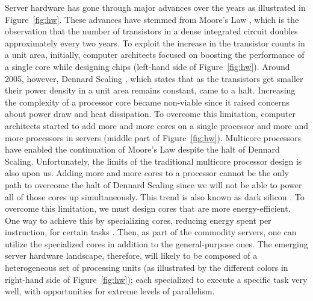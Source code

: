 \documentclass[11pt,dvipdfm]{article}
\newcommand{\reffig}[1]{Figure~\ref{fig:#1}}
\begin{document}
Server hardware has gone through major advances over the years as illustrated in \reffig{hw}.
These advances have stemmed from Moore’s Law \cite{Moore65},
which is the observation that the number of transistors in a dense integrated circuit doubles approximately every two years.
To exploit the increase in the transistor counts in a unit area, initially,
computer architects focused on boosting the performance of a single core while designing chips
(left-hand side of \reffig{hw}).
Around 2005, however, Dennard Scaling \cite{DennardGYRBAL74},
which states that as the transistors get smaller their power density in a unit area remains constant, came to a halt.
Increasing the complexity of a processor core became non-viable since it raised concerns about power draw and heat dissipation.
To overcome this limitation, computer architects started to add more and more cores on a single processor \cite{OlukotunNHWC96}
and more and more processors in servers (middle part of \reffig{hw}).
Multicore processors have enabled the continuation of Moore’s Law despite the halt of Dennard Scaling.
Unfortunately, the limits of the traditional multicore processor design is also upon us. 
Adding more and more cores to a processor cannot be the only path to overcome the halt of Dennard Scaling
since we will not be able to power all of those cores up simultaneously.
This trend is also known as dark silicon \cite{EsmaeilzadehBASB11}.
To overcome this limitation, we must design cores that are more energy-efficient.
One way to achieve this by specializing cores, reducing energy spent per instruction, for certain tasks \cite{HennessyP19}.
Then, as part of the commodity servers, one can utilize the specialized cores in addition to the general-purpose ones.
The emerging server hardware landscape, therefore,
will likely to be composed of a heterogeneous set of processing units
(as illustrated by the different colors in right-hand side of \reffig{hw});
each specialized to execute a specific task very well,
with opportunities for extreme levels of parallelism.
\end{document}
